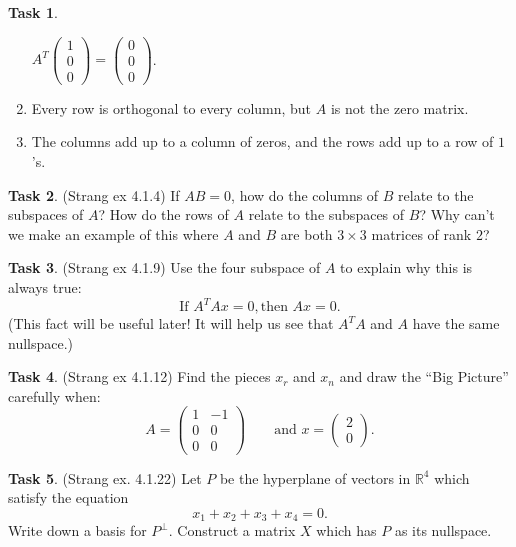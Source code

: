 \documentclass[10pt,]{book}
\theoremstyle{plain}
\theoremstyle{definition}
\numberwithin{equation}{section}
\newtheorem{task}{Task}[chapter]
\begin{document}
\begin{task}
\begin{enumerate}
            \(A^T\begin{pmatrix}1 \\ 0 \\ 0 \end{pmatrix} =
              \begin{pmatrix} 0 \\ 0 \\ 0 \end{pmatrix}\).
          \item{}
            Every row is orthogonal to every column, but \(A\) is not the zero matrix.
          \item{}
            The columns add up to a column of zeros, and the rows add up to a row of \(1\)'s.
          \end{enumerate}
\end{task}
\begin{task}
\label{task-123}
(Strang ex 4.1.4)
        If \(AB = 0\), how do the columns of \(B\) relate to the subspaces
        of \(A\)? How do the rows of \(A\) relate to the subspaces of \(B\)?
        Why can't we make an example of this where \(A\) and \(B\) are both
        \(3 \times 3\) matrices of rank \(2\)?
      \end{task}
\begin{task}
\label{task-124}
(Strang ex 4.1.9)
        Use the four subspace of \(A\) to explain why this is always true:
        \[\text{If } A^T Ax = 0, \text{then } Ax = 0.\]
        (This fact will be useful later! It will help us see that \(A^TA\) and
        \(A\) have the same nullspace.)
      \end{task}
\begin{task}
\label{task-125}
(Strang ex 4.1.12)
        Find the pieces \(x_r\) and \(x_n\) and draw the ``Big Picture''
        carefully when:
        \[ A = \begin{pmatrix} 1 & -1 \\ 0 & 0 \\ 0 & 0 \end{pmatrix}
          \qquad \text{and } x = \begin{pmatrix} 2 \\ 0 \end{pmatrix}.
        \]\end{task}
\begin{task}
\label{task-126}
(Strang ex. 4.1.22)
        Let \(P\) be the hyperplane of vectors in \(\mathbb{R}^4\) which
        satisfy the equation
        \[ x_1 + x_2 + x_3 + x_4 = 0 .\]
        Write down a basis for \(P^{\perp}\). Construct a matrix \(X\) which
        has \(P\) as its nullspace.
      \end{task}
\clearpage
\typeout{************************************************}
\typeout{************************************************}
\end{document}
